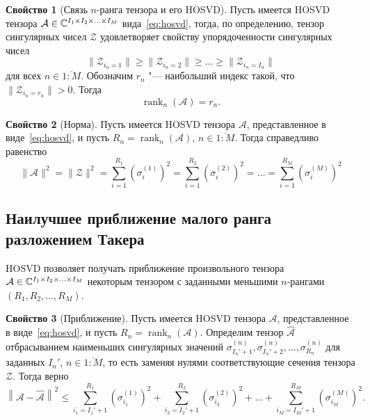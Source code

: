 \documentclass[specialist,
  substylefile = spbu.rtx,
subf,href,colorlinks=true, 12pt]{disser}
\theoremstyle{plain}
\theoremstyle{definition}
\newtheorem{property}{Свойство}[section]
\theoremstyle{remark}
\begin{document}
\begin{property}
  [Связь $n$-ранга тензора и его HOSVD]
  \label{property:n-rank}
  Пусть имеется HOSVD тензора $\mathcal{A}\in \mathbb{C}^{I_1\times
  I_2\times \ldots \times I_M}$
  вида~\eqref{eq:hosvd},
  тогда, по определению, тензор сингулярных чисел $\mathcal{Z}$
  удовлетворяет свойству упорядоченности
  сингулярных чисел
  \[\|\mathcal{Z}_{i_n=1}\|\geqslant\|\mathcal{Z}_{i_n=2}\|\geqslant\ldots
  \geqslant \|\mathcal{Z}_{i_n=I_n}\|\]
  для всех $n\in \overline{1:M}$.
  Обозначим $r_n$ "--- наибольший индекс такой, что
  $\|\mathcal{Z}_{i_n=r_n}\|>0$.
  Тогда
  \begin{equation}
    \operatorname{rank}_n(\mathcal{A})=r_n.\label{eq:n-rank}
  \end{equation}
\end{property}

\begin{property}[Норма]
  \label{property:norm}
  Пусть имеется HOSVD тензора $\mathcal{A}$, представленное в
  виде~\eqref{eq:hosvd}, и пусть $R_n=\operatorname{rank}_n(\mathcal{A})$,
  $n\in \overline{1:M}$.
  Тогда справедливо равенство
  \begin{equation}\label{eq:hosvd-norm}
    \|\mathcal{A}\|^2=\|\mathcal{Z}\|^2 =\sum_{i=1}^{R_1}\left(
    \sigma_i^{(1)} \right)^2=\sum_{i=1}^{R_2}\left( \sigma_i^{(2)} \right)^2
    =\ldots =\sum_{i=1}^{R_M}\left( \sigma_i^{(M)} \right)^2
  \end{equation}
\end{property}

\subsection{Наилучшее приближение малого ранга разложением
Такера}\label{subsec:tensor-approx}
HOSVD позволяет получать приближение произвольного тензора
$\mathcal{A}\in \mathbb{C}^{I_1 \times I_2 \times \ldots \times I_M}$ некоторым
тензором с заданными меньшими $n$-рангами
$(R_1, R_2, \ldots, R_M)$.

\begin{property}[Приближение]
  \label{property:approx}
  Пусть имеется HOSVD тензора $\mathcal{A}$, представленное в
  виде~\eqref{eq:hosvd}, и пусть $R_n=\operatorname{rank}_n(\mathcal{A})$.
  Определим тензор $\widehat{\mathcal{A}}$ отбрасыванием наименьших
  сингулярных значений $\sigma_{I_{n}'+1}^{(n)},
  \sigma_{I_{n}'+2}^{(n)},\ldots, \sigma_{R_n}^{(n)}$
  для заданных $I_{n}'$, $n \in \overline{1:M}$, то есть заменяя
  нулями соответствующие сечения тензора $\mathcal{Z}$.
  Тогда верно
  \begin{equation}
    \left\|\mathcal{A}-\widehat{\mathcal{A}}\right\|^2\leqslant
    \sum_{i_1=I_{1}'+1}^{R_1}\left( \sigma_{i_1}^{(1)}\right)^2 +
    \sum_{i_2=I_{2}'+1}^{R_2}\left( \sigma_{i_2}^{(2)}\right)^2 +
    \ldots + \sum_{i_M=I_{M}'+1}^{R_M}\left(
    \sigma_{i_M}^{(M)}\right)^2.\label{eq:approx}
  \end{equation}
\end{property}
\end{document}
